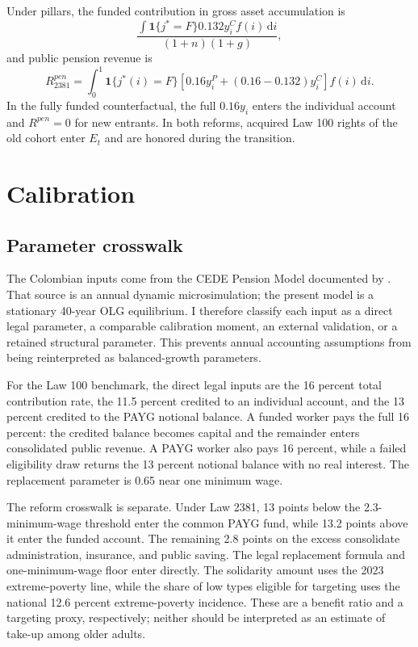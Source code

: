 \documentclass[12pt]{article}
\newcommand{\1}{\mathbf{1}}
\newcommand{\dd}{\,\mathrm{d}}
\begin{document}
Under pillars, the funded contribution in gross asset accumulation is
\[
\frac{\int \1\{j^*=F\}0.132y_i^C f(i)\dd i}{(1+n)(1+g)},
\]
and public pension revenue is
\begin{equation}
R^{pen}_{2381}=\int_0^1\1\{j^*(i)=F\}
\left[0.16y_i^P+(0.16-0.132)y_i^C\right]f(i)\dd i.
\label{eq:pillarrevenue}
\end{equation}
In the fully funded counterfactual, the full $0.16y_i$ enters the individual account and
$R^{pen}=0$ for new entrants. In both reforms, acquired Law 100 rights of the old cohort enter
$E_t$ and are honored during the transition.
\section{Calibration}

\subsection{Parameter crosswalk}

The Colombian inputs come from the CEDE Pension Model documented by \citet{Becerra2025}.
That source is an annual dynamic microsimulation; the present model is a stationary
40-year OLG equilibrium. I therefore classify each input as a direct legal parameter, a
comparable calibration moment, an external validation, or a retained structural parameter.
This prevents annual accounting assumptions from being reinterpreted as balanced-growth
parameters.

For the Law 100 benchmark, the direct legal inputs are the 16 percent total contribution rate,
the 11.5 percent credited to an individual account, and the 13 percent credited to the PAYG
notional balance. A funded worker pays the full 16 percent: the credited balance becomes capital
and the remainder enters consolidated public revenue. A PAYG worker also pays 16 percent, while
a failed eligibility draw returns the 13 percent notional balance with no real interest. The
replacement parameter is 0.65 near one minimum wage.

The reform crosswalk is separate. Under Law 2381, 13 points below the 2.3-minimum-wage
threshold enter the common PAYG fund, while 13.2 points above it enter the funded account. The
remaining 2.8 points on the excess consolidate administration, insurance, and public saving.
The legal replacement formula and one-minimum-wage floor enter directly. The solidarity amount
uses the 2023 extreme-poverty line, while the share of low types eligible for targeting uses the
national 12.6 percent extreme-poverty incidence. These are a benefit ratio and a targeting proxy,
respectively; neither should be interpreted as an estimate of take-up among older adults.
\end{document}
